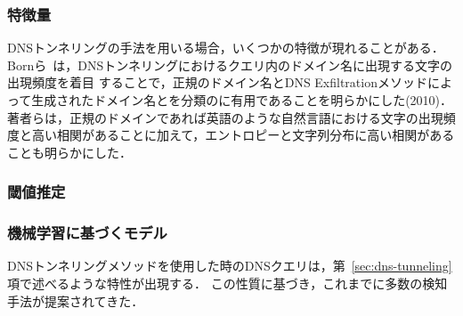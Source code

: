 \subsubsection{特徴量}
DNSトンネリングの手法を用いる場合，いくつかの特徴が現れることがある．
Bornら~\cite{born}は，DNSトンネリングにおけるクエリ内のドメイン名に出現する文字の出現頻度を着目
することで，正規のドメイン名とDNS Exfiltrationメソッドによって生成されたドメイン名とを分類のに有用であることを明らかにした(2010)．
著者らは，正規のドメインであれば英語のような自然言語における文字の出現頻度と高い相関があることに加えて，エントロピーと文字列分布に高い相関があることも明らかにした．


\subsubsection{閾値推定}
\subsubsection{機械学習に基づくモデル}
DNSトンネリングメソッドを使用した時のDNSクエリは，第~\ref{sec:dns-tunneling}項で述べるような特性が出現する．
この性質に基づき，これまでに多数の検知手法が提案されてきた．

